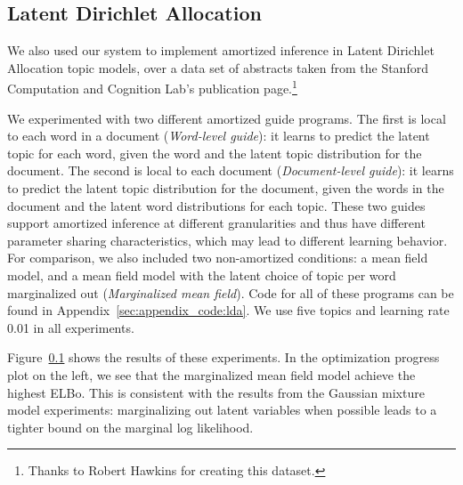 %
%


\subsection{Latent Dirichlet Allocation}
\label{sec:results_lda}

We also used our system to implement amortized inference in Latent Dirichlet Allocation topic models, over a data set of abstracts taken from the Stanford Computation and Cognition Lab's publication page.\footnote{Thanks to Robert Hawkins for creating this dataset.}

We experimented with two different amortized guide programs.
The first is local to each word in a document (\emph{Word-level guide}): it learns to predict the latent topic for each word, given the word and the latent topic distribution for the document.
The second is local to each document (\emph{Document-level guide}): it learns to predict the latent topic distribution for the document, given the words in the document and the latent word distributions for each topic.
These two guides support amortized inference at different granularities and thus have different parameter sharing characteristics, which may lead to different learning behavior.
For comparison, we also included two non-amortized conditions: a mean field model, and a mean field model with the latent choice of topic per word marginalized out (\emph{Marginalized mean field}).
Code for all of these programs can be found in Appendix~\ref{sec:appendix_code:lda}.
We use five topics and learning rate 0.01 in all experiments.

Figure~\ref{sec:results_lda} shows the results of these experiments.
In the optimization progress plot on the left, we see that the marginalized mean field model achieve the highest ELBo.
This is consistent with the results from the Gaussian mixture model experiments: marginalizing out latent variables when possible leads to a tighter bound on the marginal log likelihood.

